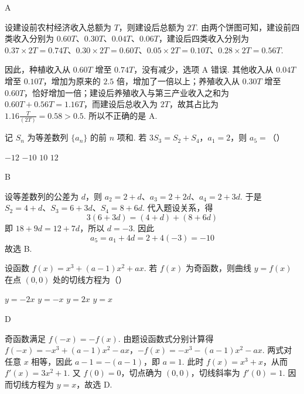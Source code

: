 \begin{answer}
A
\end{answer}

\begin{solution}
设建设前农村经济收入总额为 \(T\)，则建设后总额为 \(2T\). 由两个饼图可知，建设前四类收入分别为
\(0.60T\)、\(0.30T\)、\(0.04T\)、\(0.06T\)，建设后四类收入分别为
\(0.37\times2T=0.74T\)、\(0.30\times2T=0.60T\)、\(0.05\times2T=0.10T\)、\(0.28\times2T=0.56T\).

因此，种植收入从 \(0.60T\) 增至 \(0.74T\)，没有减少，选项 A 错误. 其他收入从 \(0.04T\) 增至 \(0.10T\)，增加为原来的 \(2.5\) 倍，增加了一倍以上；养殖收入从 \(0.30T\) 增至 \(0.60T\)，恰好增加一倍；建设后养殖收入与第三产业收入之和为 \(0.60T+0.56T=1.16T\)，而建设后总收入为 \(2T\)，故其占比为 \(1.16\frac{T}{(2T)}=0.58>0.5\). 所以不正确的是 A.
\end{solution}

\begin{problem}
记 \(S_n\) 为等差数列 \(\{a_n\}\) 的前 \(n\) 项和. 若 \(3S_3=S_2+S_4\)，\(a_1=2\)，则 \(a_5=\)（\quad）

\choices
    {\(-12\)}
    {\(-10\)}
    {\(10\)}
    {\(12\)}
\end{problem}

\begin{answer}
B
\end{answer}

\begin{solution}
设等差数列的公差为 \(d\)，则
\(a_2=2+d\)、\(a_3=2+2d\)、\(a_4=2+3d\).
于是
\(S_2=4+d\)、\(S_3=6+3d\)、\(S_4=8+6d\).
代入题设关系，得
\[
3(6+3d)=(4+d)+(8+6d)
\]
即 \(18+9d=12+7d\)，所以 \(d=-3\).
因此
\[
a_5=a_1+4d=2+4(-3)=-10
\]
故选 B.
\end{solution}

\begin{problem}
设函数 \(f(x)=x^3+(a-1)x^2+ax\). 若 \(f(x)\) 为奇函数，则曲线 \(y=f(x)\) 在点 \((0,0)\) 处的切线方程为（\quad）

\choices
    {\(y=-2x\)}
    {\(y=-x\)}
    {\(y=2x\)}
    {\(y=x\)}
\end{problem}

\begin{answer}
D
\end{answer}

\begin{solution}
奇函数满足 \(f(-x)=-f(x)\). 由题设函数式分别计算得
\(f(-x)=-x^3+(a-1)x^2-ax\)，\(-f(x)=-x^3-(a-1)x^2-ax\).
两式对任意 \(x\) 相等，因此 \(a-1=-(a-1)\)，即 \(a=1\). 此时
\(f(x)=x^3+x\)，从而 \(f'(x)=3x^2+1\).
又 \(f(0)=0\)，切点确为 \((0,0)\)，切线斜率为 \(f'(0)=1\). 因而切线方程为 \(y=x\)，故选 D.
\end{solution}

